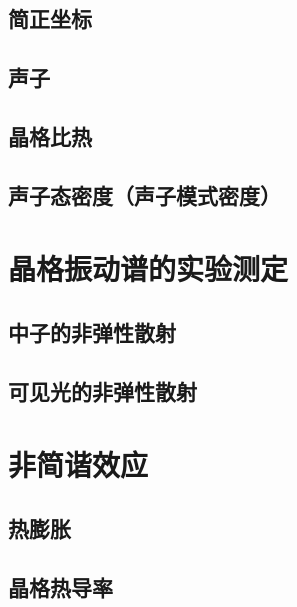         \subsection{简正坐标}
        \subsection{声子}
        \subsection{晶格比热}
        \subsection{声子态密度（声子模式密度）}
    \section{晶格振动谱的实验测定}
        \subsection{中子的非弹性散射}
        \subsection{可见光的非弹性散射}
    \section{非简谐效应}
        \subsection{热膨胀}
        \subsection{晶格热导率}